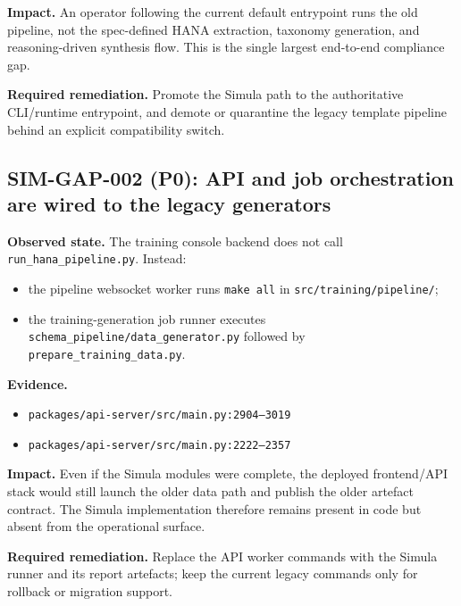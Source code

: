 \textbf{Impact.}
An operator following the current default entrypoint runs the old
pipeline, not the spec-defined HANA extraction, taxonomy generation,
and reasoning-driven synthesis flow. This is the single largest
end-to-end compliance gap.

\textbf{Required remediation.}
Promote the Simula path to the authoritative CLI/runtime entrypoint,
and demote or quarantine the legacy template pipeline behind an
explicit compatibility switch.

\subsection*{SIM-GAP-002 (P0): API and job orchestration are wired to the legacy generators}
\textbf{Observed state.}
The training console backend does not call
\texttt{run\_hana\_pipeline.py}. Instead:
\begin{itemize}
  \item the pipeline websocket worker runs \texttt{make all} in
    \texttt{src/training/pipeline/};
  \item the training-generation job runner executes
    \texttt{schema\_pipeline/data\_generator.py} followed by
    \texttt{prepare\_training\_data.py}.
\end{itemize}

\textbf{Evidence.}
\begin{itemize}
  \item \texttt{packages/api-server/src/main.py:2904--3019}
  \item \texttt{packages/api-server/src/main.py:2222--2357}
\end{itemize}

\textbf{Impact.}
Even if the Simula modules were complete, the deployed frontend/API
stack would still launch the older data path and publish the older
artefact contract. The Simula implementation therefore remains
present in code but absent from the operational surface.

\textbf{Required remediation.}
Replace the API worker commands with the Simula runner and its report
artefacts; keep the current legacy commands only for rollback or
migration support.

